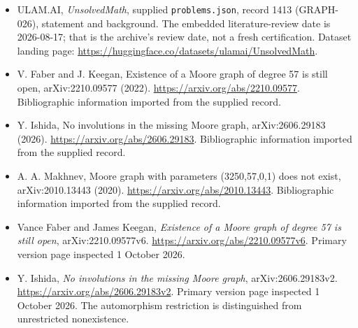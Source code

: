 \documentclass[11pt,a4paper]{article}
\begin{document}
{\small

\begin{itemize}

\item[\hypertarget{source:1413:1}{S1}] ULAM.AI, \emph{UnsolvedMath}, supplied \texttt{problems.json}, record 1413 (GRAPH-026), statement and background. The embedded literature-review date is 2026-08-17; that is the archive’s review date, not a fresh certification. Dataset landing page: \url{https://huggingface.co/datasets/ulamai/UnsolvedMath}.

\item[\hypertarget{source:1413:2}{S2}] V. Faber and J. Keegan, Existence of a Moore graph of degree 57 is still open, arXiv:2210.09577 (2022). \url{https://arxiv.org/abs/2210.09577}. Bibliographic information imported from the supplied record.

\item[\hypertarget{source:1413:3}{S3}] Y. Ishida, No involutions in the missing Moore graph, arXiv:2606.29183 (2026). \url{https://arxiv.org/abs/2606.29183}. Bibliographic information imported from the supplied record.

\item[\hypertarget{source:1413:4}{S4}] A. A. Makhnev, Moore graph with parameters (3250,57,0,1) does not exist, arXiv:2010.13443 (2020). \url{https://arxiv.org/abs/2010.13443}. Bibliographic information imported from the supplied record.


\item[E1] Vance Faber and James Keegan,
\emph{Existence of a Moore graph of degree 57 is still open},
arXiv:2210.09577v6. \url{https://arxiv.org/abs/2210.09577v6}.
Primary version page inspected 1 October 2026.
\item[E2] Y. Ishida, \emph{No involutions in the missing Moore graph},
arXiv:2606.29183v2. \url{https://arxiv.org/abs/2606.29183v2}.
Primary version page inspected 1 October 2026. The automorphism
restriction is distinguished from unrestricted nonexistence.

\end{itemize}

}

\label{end:1413}
\end{document}
